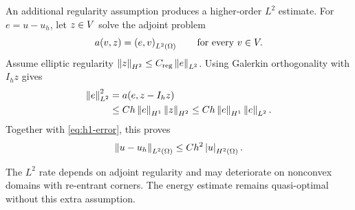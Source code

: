 An additional regularity assumption produces a higher-order $L^2$ estimate.
For $e=u-u_h$, let $z\in V$ solve the adjoint problem
\begin{equation}
  a(v,z)=\left( e,v \right)_{L^2(\Omega)}
  \qquad\text{for every }v\in V.
  \label{eq:dual-problem}
\end{equation}
Assume elliptic regularity $\left\lVert z \right\rVert_{H^2}\leq C_{\mathrm{reg}}\left\lVert e \right\rVert_{L^2}$.
Using Galerkin orthogonality with $I_hz$ gives
\begin{align}
  \left\lVert e \right\rVert_{L^2}^2
  &=a(e,z-I_hz)\notag\\
  &\leq C h\left\lVert e \right\rVert_{H^1}\left\lVert z \right\rVert_{H^2}
  \leq C h\left\lVert e \right\rVert_{H^1}\left\lVert e \right\rVert_{L^2}.
  \label{eq:duality-chain}
\end{align}
Together with \cref{eq:h1-error}, this proves
\begin{equation}
  \left\lVert u-u_h \right\rVert_{L^2(\Omega)}
  \leq C h^2\left\lvert u \right\rvert_{H^2(\Omega)}.
  \label{eq:l2-error}
\end{equation}

\begin{remark}
The $L^2$ rate depends on adjoint regularity and may deteriorate on nonconvex
domains with re-entrant corners. The energy estimate remains quasi-optimal
without this extra assumption.
\end{remark}

